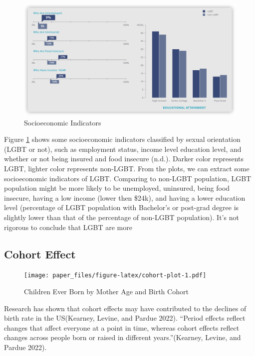 \documentclass[
]{article}
\begin{document}
\begin{figure}

{\centering \includegraphics[width=.80\linewidth]{./images/LGBT-socioeconomic-indicators} 

}

\caption{Socioeconomic Indicators}\label{fig:fig-LGBT-socioeconomic-indicators}
\end{figure}

Figure \ref{fig:fig-LGBT-socioeconomic-indicators} shows some socioeconomic indicators classified by sexual orientation (LGBT or not), such as employment status, income level education level, and whether or not being insured and food insecure (n.d.). Darker color represents LGBT, lighter color represents non-LGBT.
From the plots, we can extract some socioeconomic indicators of LGBT. Comparing to non-LGBT population, LGBT population might be more likely to be unemployed, uninsured, being food insecure, having a low income (lower then \$24k), and having a lower education level (percentage of LGBT population with Bachelor's or post-grad degree is slightly lower than that of the percentage of non-LGBT population). It's not rigorous to conclude that LGBT are more

\hypertarget{cohort-effect}{%
\subsection{Cohort Effect}\label{cohort-effect}}

\begin{figure}
\centering
\texttt{[image: paper\_files/figure-latex/cohort-plot-1.pdf]}
\caption{\label{fig:cohort-plot}Children Ever Born by Mother Age and Birth Cohort}
\end{figure}

Research has shown that cohort effects may have contributed to the declines of birth rate in the US(Kearney, Levine, and Pardue 2022).
``Period effects reflect changes that affect everyone at a point in time, whereas cohort effects reflect changes across people born or raised in different years.''(Kearney, Levine, and Pardue 2022).
\end{document}
